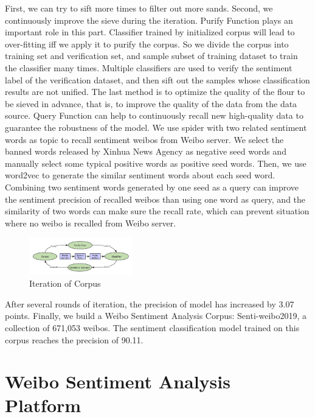 \documentclass[runningheads]{llncs}
\begin{document}
First, we can try to sift more times to filter out more sands. Second, we continuously improve the sieve during the iteration. Purify Function plays an important role in this part. Classifier trained by initialized corpus will lead to over-fitting iff we apply it to purify the corpus. So we divide the corpus into training set and verification set, and sample subset of training dataset to train the classifier many times. Multiple classifiers are used to verify the sentiment label of the verification dataset, and then sift out the samples whose classification results are not unified. The last method is to optimize the quality of the flour to be sieved in advance, that is, to improve the quality of the data from the data source. Query Function can help to continuously recall new high-quality data to guarantee the robustness of the model. We use spider with two related sentiment words as topic to recall sentiment weibos from Weibo server. We select the banned words released by Xinhua News Agency as negative seed words and manually select some typical positive words as positive seed words. Then, we use word2vec to generate the similar sentiment words about each seed word. Combining two sentiment words generated by one seed as a query can improve the sentiment precision of recalled weibos than using one word as query, and the similarity of two words can make sure the recall rate, which can prevent situation where no weibo is recalled from Weibo server. 

\begin{figure}[htp]
\begin{center}
\includegraphics[width=0.40\textwidth]{images/Model-Iteration-2.png}
\caption{Iteration of Corpus}
\label{fig:model-iteration}
\end{center}
\end{figure}

After several rounds of iteration, the precision of model has increased by 3.07 points. Finally, we build a Weibo Sentiment Analysis Corpus: Senti-weibo2019, a collection of 671,053 weibos. The sentiment classification model trained on this corpus reaches the precision of 90.11. 

\section{Weibo Sentiment Analysis Platform}
\end{document}
